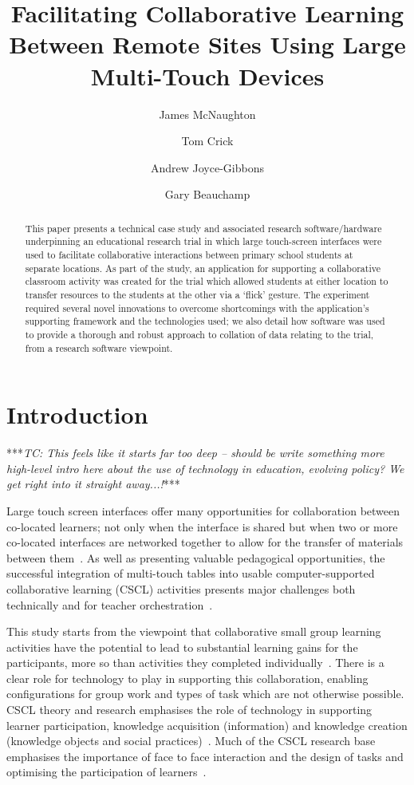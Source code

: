 \documentclass[a4paper,11pt]{article}
\title{Facilitating Collaborative Learning Between Remote Sites Using Large Multi-Touch Devices}
\author[1]{James McNaughton}
\author[2]{Tom Crick}
\author[3]{Andrew Joyce-Gibbons}
\author[4]{Gary Beauchamp}
\affil[1,3]{School of Education, Durham University, UK}
\affil[2]{Department of Computing \& Information Systems, Cardiff
  Metropolitan University, UK}
\affil[4]{School of Education, Cardiff Metropolitan University, UK}
\affil[1]{\protect\url{j.a.mcnaughton@durham.ac.uk}}
\affil[2]{\protect\url{tcrick@cardiffmet.ac.uk}}
\affil[3]{\protect\url{andrew.joyce-gibbons@durham.ac.uk}}
\affil[4]{\protect\url{gbeauchamp@cardiffmet.ac.uk}}
\date{ }
\begin{document}
\maketitle

\begin{abstract}
This paper presents a technical case study and associated research software/hardware underpinning an educational research trial in which large touch-screen interfaces were used to facilitate collaborative interactions between primary school students at separate locations.
As part of the study, an application for supporting a collaborative classroom activity was created for the trial which allowed students at either location to transfer resources to the students at the other via a `flick' gesture.
The experiment required several novel innovations to overcome shortcomings with the application's supporting framework and the technologies used; we also detail how software was used to provide a thorough and robust approach to collation of data relating to the trial, from a research software viewpoint.
\end{abstract}

\section{Introduction}

***{\emph{TC: This feels like it starts far too deep -- should be write something more high-level intro here about the use of technology in education, evolving policy? We get right into it straight away...!}}***

Large touch screen interfaces offer many opportunities for collaboration between co-located learners; not only when the interface is shared but when two or more co-located interfaces are networked together to allow for the transfer of materials between them~\cite{kharrufa:2013,kreitmayer:2013}.
As well as presenting valuable pedagogical opportunities, the successful integration of multi-touch tables into usable computer-supported collaborative learning (CSCL) activities presents major challenges both technically and for teacher orchestration~\cite{dillenbourg:2011}. 

This study starts from the viewpoint that collaborative small group learning activities have the potential to lead to substantial learning gains for the participants, more so than activities they completed individually~\cite{odonnell:2013,barron:2008}.
There is a clear role for technology to play in supporting this collaboration, enabling configurations for group work and types of task which are not otherwise possible.
CSCL theory and research emphasises the role of technology in supporting learner participation, knowledge acquisition (information) and knowledge creation (knowledge objects and social practices)~\cite{lipponen:2004}.
Much of the CSCL research base emphasises the importance of face to face interaction and the design of tasks and optimising the participation of learners~\cite{stahl:2014}.
\end{document}
